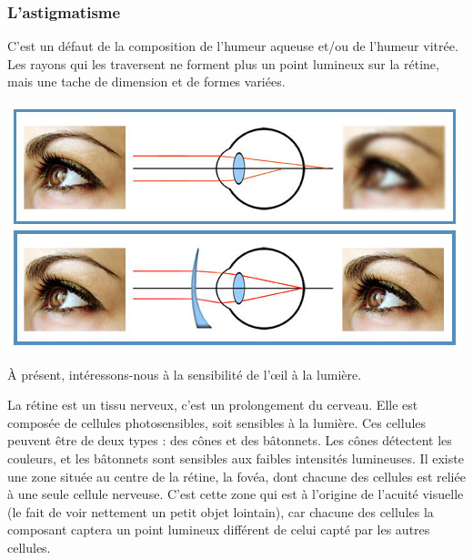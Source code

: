 \documentclass[a4paper, 12pt, onecolumn, openany]{report}
\begin{document}
	\subsubsection{L'astigmatisme}
	C’est un défaut de la composition de l’humeur aqueuse et/ou de l’humeur vitrée. Les rayons qui les traversent ne forment plus un point lumineux sur la rétine, mais une tache de dimension et de formes variées.
	
	\includegraphics[scale=0.5]{astigmatisme3.jpg}
	
	\newpage
	
	À présent, intéressons-nous à la sensibilité de l’œil à la lumière.
	
	La rétine est un tissu nerveux, c’est un prolongement du cerveau. Elle est composée de cellules photosensibles, soit sensibles à la lumière. Ces cellules peuvent être de deux types : des cônes et des bâtonnets. Les cônes détectent les couleurs, et les bâtonnets sont sensibles aux faibles intensités lumineuses. Il existe une zone située au centre de la rétine, la fovéa, dont chacune des cellules est reliée à une seule cellule nerveuse. C’est cette zone qui est à l’origine de l’acuité visuelle (le fait de voir nettement un petit objet lointain), car chacune des cellules la composant captera un point lumineux différent de celui capté par les autres cellules.
	
\end{document}
